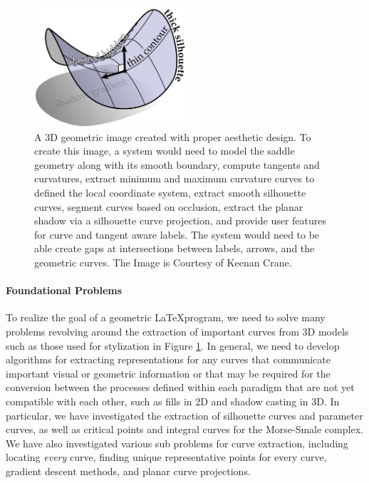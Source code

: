\documentclass[12pt, letterpaper]{article}
\begin{document}
	\begin{figure}[h]
	\centering
	\includegraphics[width=0.5\textwidth]{StylizedFigure}
	\caption{A 3D geometric image created with proper aesthetic design. To create this image, a system would need to model the saddle geometry along
	with its smooth boundary, compute tangents and curvatures,
	extract minimum and maximum curvature curves to defined the local coordinate system, extract smooth silhouette curves, segment curves based on occlusion,
	extract the planar shadow via a silhouette curve projection, and provide user features for curve and tangent aware labels.
	The system would need to be able create gaps at intersections between labels, arrows, and the geometric curves.
	The Image is Courtesy of Keenan Crane.}
	\label{fig:keenan_style}
	\end{figure}

\newpage

	\paragraph{Foundational Problems}
	To realize the goal of a geometric \LaTeX program, we need to solve many problems revolving around the extraction of important curves from 3D models
	such as those used for stylization in Figure \ref{fig:keenan_style}. In general, we need to develop algorithms for extracting representations for any curves
	that communicate important visual or geometric information or that may be required for the conversion between the processes defined within each paradigm
	that are not yet compatible with each other, such as fills in 2D and shadow casting in 3D. In particular, we have investigated the extraction of silhouette curves and parameter curves,
	as well as critical points and integral curves for the Morse-Smale complex. We have also investigated various sub problems for curve extraction,
	including locating \emph{every} curve, finding unique representative points for every curve, gradient descent methods, and planar curve projections.
\end{document}
